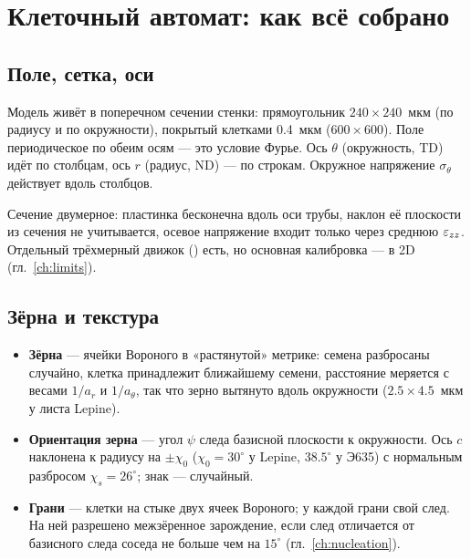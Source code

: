 \chapter{Клеточный автомат: как всё собрано}\label{ch:automaton}

\section{Поле, сетка, оси}

Модель живёт в поперечном сечении стенки: прямоугольник $240\times240$~мкм (по радиусу и по
окружности), покрытый клетками 0.4~мкм ($600\times600$). Поле периодическое по обеим осям ---
это условие Фурье. Ось $\theta$ (окружность, TD) идёт по столбцам, ось $r$ (радиус, ND) --- по
строкам. Окружное напряжение $\sigma_\theta$ действует вдоль столбцов.

\begin{warnbox}
Сечение двумерное: пластинка бесконечна вдоль оси трубы, наклон её плоскости из сечения не
учитывается, осевое напряжение входит только через среднюю $\varepsilon_{zz}$. Отдельный трёхмерный
движок () есть, но основная калибровка --- в 2D (гл.~\ref{ch:limits}).
\end{warnbox}

\section{Зёрна и текстура}


\begin{itemize}
\item \textbf{Зёрна} --- ячейки Вороного в «растянутой» метрике: семена разбросаны случайно, клетка
  принадлежит ближайшему семени, расстояние меряется с весами $1/a_r$ и $1/a_\theta$, так что зерно
  вытянуто вдоль окружности ($2.5\times4.5$~мкм у листа Lepine).
\item \textbf{Ориентация зерна} --- угол $\psi$ следа базисной плоскости к окружности. Ось $c$
  наклонена к радиусу на $\pm\chi_0$ ($\chi_0=30^\circ$ у Lepine, $38.5^\circ$ у Э635) с нормальным
  разбросом $\chi_s=26^\circ$; знак --- случайный.
\item \textbf{Грани} --- клетки на стыке двух ячеек Вороного; у каждой грани свой след. На ней
  разрешено межзёренное зарождение, если след отличается от базисного следа соседа не больше
  чем на $15^\circ$ (гл.~\ref{ch:nucleation}).
\end{itemize}

